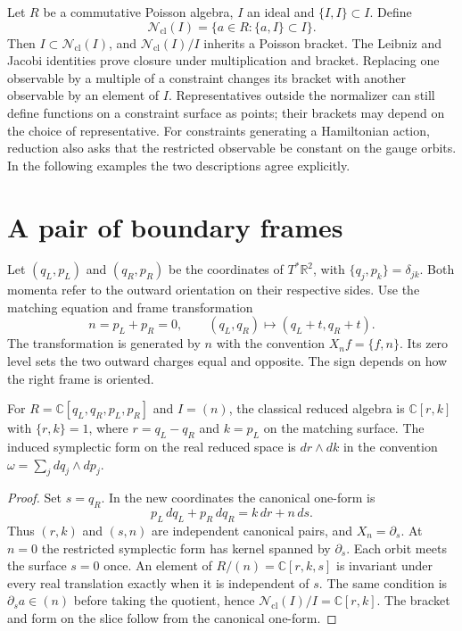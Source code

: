 \documentclass[11pt,letterpaper]{article}
\newcommand{\cN}{\mathcal N}
\newcommand{\CC}{\mathbb C}
\newcommand{\RR}{\mathbb R}
\begin{document}
Let $R$ be a commutative Poisson algebra, $I$ an ideal and $\{I,I\}\subset I$. Define
\[
 \cN_{\mathrm{cl}}(I)=\{a\in R:\{a,I\}\subset I\}.
\]
Then $I\subset\cN_{\mathrm{cl}}(I)$, and $\cN_{\mathrm{cl}}(I)/I$ inherits a Poisson bracket.
The Leibniz and Jacobi identities prove closure under multiplication and bracket. Replacing
one observable by a multiple of a constraint changes its bracket with another observable by an
element of $I$. Representatives outside the normalizer can still define functions on a
constraint surface as points; their brackets may depend on the choice of representative. For
constraints generating a Hamiltonian action, reduction also asks that the restricted
observable be constant on the gauge orbits. In the following examples the two descriptions
agree explicitly.

\section{A pair of boundary frames}
\label{sec:pair}
Let $(q_L,p_L)$ and $(q_R,p_R)$ be the coordinates of $T^*\RR^2$, with
$\{q_j,p_k\}=\delta_{jk}$. Both momenta refer to the outward orientation on their respective
sides. Use the matching equation and frame transformation
\[
 n=p_L+p_R=0,\qquad (q_L,q_R)\longmapsto(q_L+t,q_R+t).
\]
The transformation is generated by $n$ with the convention $X_n f=\{f,n\}$. Its zero level
sets the two outward charges equal and opposite. The sign depends on how the right frame is
oriented.

\begin{proposition}\label{prop:class}
For $R=\CC[q_L,q_R,p_L,p_R]$ and $I=(n)$, the classical reduced algebra is $\CC[r,k]$ with
$\{r,k\}=1$, where $r=q_L-q_R$ and $k=p_L$ on the matching surface. The induced symplectic
form on the real reduced space is $dr\wedge dk$ in the convention $\omega=\sum_j dq_j\wedge
dp_j$.
\end{proposition}
\begin{proof}
Set $s=q_R$. In the new coordinates the canonical one-form is
\[
 p_L\,dq_L+p_R\,dq_R=k\,dr+n\,ds .
\]
Thus $(r,k)$ and $(s,n)$ are independent canonical pairs, and $X_n=\partial_s$. At $n=0$ the
restricted symplectic form has kernel spanned by $\partial_s$. Each orbit meets the surface
$s=0$ once. An element of $R/(n)=\CC[r,k,s]$ is invariant under every real translation exactly
when it is independent of $s$. The same condition is $\partial_s a\in(n)$ before taking the
quotient, hence $\cN_{\mathrm{cl}}(I)/I=\CC[r,k]$. The bracket and form on the slice follow
from the canonical one-form.
\end{proof}
\end{document}
